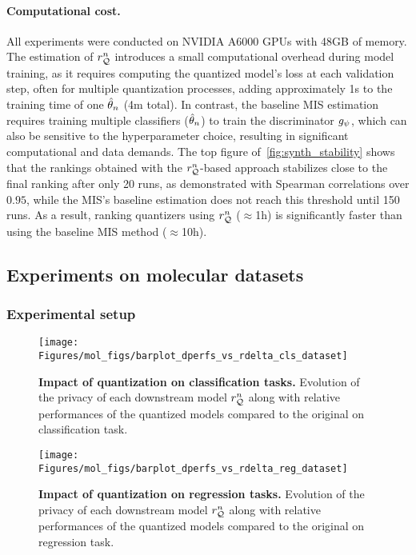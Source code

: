 \paragraph{Computational cost.}
All experiments were conducted on NVIDIA A6000 GPUs with 48GB of memory.
The estimation of $r_{{\mathcal{Q}}}^n$ introduces a small computational overhead during model training, as it requires computing the quantized model's loss at each validation step, often for multiple quantization processes, adding approximately 1s to the training time of one ${\hat{\theta}_n}$ (4m total).
In contrast, the baseline MIS estimation requires training multiple classifiers (${\hat{\theta}_n}$) to train the discriminator $g_\psi$, which can also be sensitive to the hyperparameter choice, resulting in significant computational and data demands.
The top figure of~\autoref{fig:synth_stability} shows that the rankings obtained with the $r_{{\mathcal{Q}}}^n$-based approach stabilizes close to the final ranking after only 20 runs, as demonstrated with Spearman correlations over $0.95$, while the MIS's baseline estimation does not reach this threshold until 150 runs.
As a result, ranking quantizers using $r_{{\mathcal{Q}}}^n$ ($\approx$1h) is significantly faster than using the baseline MIS method ($\approx$10h).

\subsection{Experiments on molecular datasets}
\label{subsec:molecular_expe}

\subsubsection{Experimental setup}
\begin{figure*}
    \centering
    \texttt{[image: Figures/mol\_figs/barplot\_dperfs\_vs\_rdelta\_cls\_dataset]}
    \caption{
        \textbf{Impact of quantization on classification tasks.}
        Evolution of the privacy of each downstream model $r_{{\mathcal{Q}}}^n$ along with relative performances of the quantized models compared to the original on classification task.
    }
    \label{fig:barplot_dperfs_vs_rdelta_cls_dataset}
    \vspace{-0.25cm}
\end{figure*}

\begin{figure}
    \centering
    \texttt{[image: Figures/mol\_figs/barplot\_dperfs\_vs\_rdelta\_reg\_dataset]}
    \caption{
        \textbf{Impact of quantization on regression tasks.}
        Evolution of the privacy of each downstream model $r_{{\mathcal{Q}}}^n$ along with relative performances of the quantized models compared to the original on regression task.
    }
    \label{fig:barplot_dperfs_vs_rdelta_reg_dataset}
    \vspace{-0.5cm}
\end{figure}


